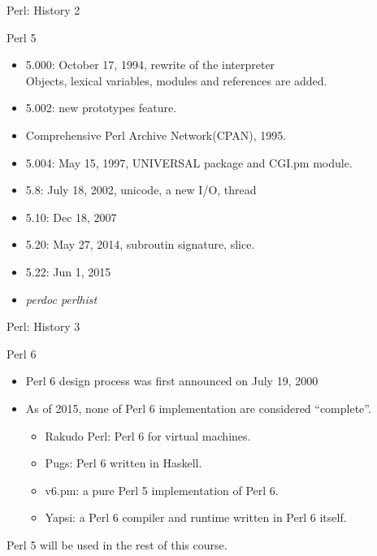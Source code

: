 \documentclass[UTF8]{beamer}
\begin{document}
\begin{frame}[t]{Perl: History 2}
\begin{block}{Perl 5}
  \begin{itemize}
    \item 5.000: October 17, 1994, rewrite of the interpreter\\
    Objects, lexical variables, modules and references are added.
    \item 5.002: new prototypes feature.
    \item Comprehensive Perl Archive Network(CPAN), 1995.
    \item 5.004: May 15, 1997, UNIVERSAL package and CGI.pm module.
    \item 5.8: July 18, 2002, unicode, a new I/O, thread
    \item 5.10: Dec 18, 2007
    \item 5.20: May 27, 2014, subroutin signature, slice.
    \item 5.22: Jun 1, 2015
    \item \textit{perdoc perlhist}
  \end{itemize}
\end{block}
\end{frame}

\begin{frame}[t]{Perl: History 3}
\begin{block}{Perl 6}
  \begin{itemize}
    \item Perl 6 design process was first announced on July 19, 2000
    \item As of 2015, none of Perl 6 implementation are considered ``complete''.
    \begin{itemize}
      \item Rakudo Perl: Perl 6 for virtual machines.
      \item Pugs: Perl 6 written in Haskell.
      \item v6.pm: a pure Perl 5 implementation of Perl 6.
      \item Yapsi: a Perl 6 compiler and runtime written in Perl 6 itself.
    \end{itemize}
  \end{itemize}
  Perl 5 will be used in the rest of this course.
\end{block}
\end{frame}
\end{document}
